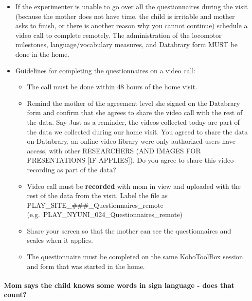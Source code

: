 \documentclass[
]{book}
\providecommand{\tightlist}{%
  \setlength{\itemsep}{0pt}\setlength{\parskip}{0pt}}
\begin{document}
\begin{itemize}
\tightlist
\item
  If the experimenter is unable to go over all the questionnaires during the visit (because the mother does not have time, the child is irritable and mother asks to finish, or there is another reason why you cannot continue) schedule a video call to complete remotely. The administration of the locomotor milestones, language/vocabulary measures, and Databrary form MUST be done in the home.
\item
  Guidelines for completing the questionnaires on a video call:

  \begin{itemize}
  \tightlist
  \item
    The call must be done within 48 hours of the home visit.
  \item
    Remind the mother of the agreement level she signed on the Databrary form and confirm that she agrees to share the video call with the rest of the data. Say Just as a reminder, the videos collected today are part of the data we collected during our home visit. You agreed to share the data on Databrary, an online video library were only authorized users have access, with other RESEARCHERS (AND IMAGES FOR PRESENTATIONS {[}IF APPLIES{]}). Do you agree to share this video recording as part of the data?
  \item
    Video call must be \textbf{recorded} with mom in view and uploaded with the rest of the data from the visit. Label the file as PLAY\_SITE\_\#\#\#\_Questionnaires\_remote (e.g.~PLAY\_NYUNI\_024\_Questionnaires\_remote)
  \item
    Share your screen so that the mother can see the questionnaires and scales when it applies.
  \item
    The questionnaire must be completed on the same KoboToolBox session and form that was started in the home.
  \end{itemize}
\end{itemize}

\hypertarget{mom-says-the-child-knows-some-words-in-sign-language---does-that-count}{%
\paragraph*{Mom says the child knows some words in sign language - does that count?}\label{mom-says-the-child-knows-some-words-in-sign-language---does-that-count}}
\end{document}
